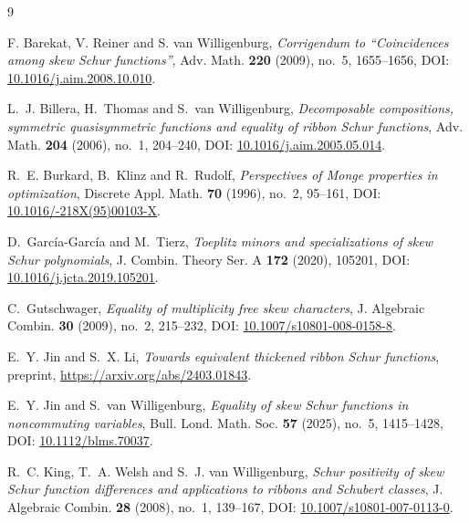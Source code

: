 \documentclass[11pt,a4paper]{amsart}
\numberwithin{equation}{section}
\theoremstyle{plain}
\theoremstyle{definition}
\begin{document}
\begin{thebibliography}{9}

F. Barekat, V. Reiner and S. van Willigenburg,
\emph{Corrigendum to ``Coincidences among skew Schur functions''},
Adv. Math. \textbf{220} (2009), no.~5, 1655--1656,
DOI: \href{https://doi.org/10.1016/j.aim.2008.10.010}{10.1016/\allowbreak j.aim.2008.10.010}.

L.~J. Billera, H.~Thomas and S.~van Willigenburg,
\emph{Decomposable compositions, symmetric quasisymmetric functions and equality of ribbon Schur functions},
Adv. Math. \textbf{204} (2006), no.~1, 204--240,
DOI: \href{https://doi.org/10.1016/j.aim.2005.05.014}{10.1016/\allowbreak j.aim.2005.05.014}.

R.~E. Burkard, B.~Klinz and R.~Rudolf,
\emph{Perspectives of Monge properties in optimization},
Discrete Appl. Math. \textbf{70} (1996), no.~2, 95--161,
DOI: \href{https://doi.org/10.1016/0166-218X(95)00103-X}{10.1016/-218X(95)00103-X}.

D.~Garc\'ia-Garc\'ia and M.~Tierz,
\emph{Toeplitz minors and specializations of skew Schur polynomials},
J. Combin. Theory Ser. A \textbf{172} (2020), 105201,
DOI: \href{https://doi.org/10.1016/j.jcta.2019.105201}{10.1016/\allowbreak j.jcta.2019.105201}.

C.~Gutschwager,
\emph{Equality of multiplicity free skew characters},
J. Algebraic Combin. \textbf{30} (2009), no.~2, 215--232,
DOI: \href{https://doi.org/10.1007/s10801-008-0158-8}{10.1007/\allowbreak s10801-008-0158-8}.

E.~Y. Jin and S.~X. Li,
\emph{Towards equivalent thickened ribbon Schur functions},
preprint, \url{https://arxiv.org/abs/2403.01843}.

E.~Y. Jin and S.~van Willigenburg,
\emph{Equality of skew Schur functions in noncommuting variables},
Bull. Lond. Math. Soc. \textbf{57} (2025), no.~5, 1415--1428,
DOI: \href{https://doi.org/10.1112/blms.70037}{10.1112/\allowbreak blms.70037}.

R.~C. King, T.~A. Welsh and S.~J. van Willigenburg,
\emph{Schur positivity of skew Schur function differences and applications to ribbons and Schubert classes},
J. Algebraic Combin. \textbf{28} (2008), no.~1, 139--167,
DOI: \href{https://doi.org/10.1007/s10801-007-0113-0}{10.1007/\allowbreak s10801-007-0113-0}.


\end{thebibliography}
\end{document}
